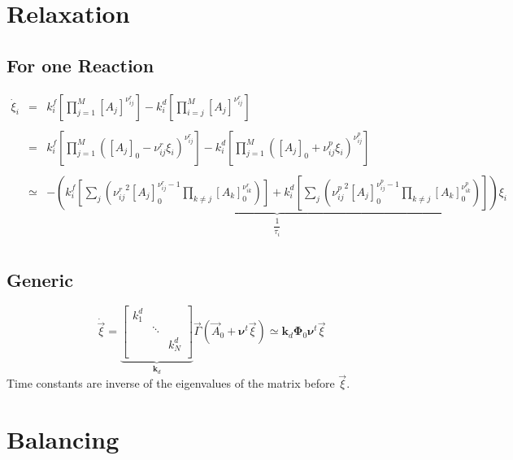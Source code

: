 \documentclass[aps,onecolumn,11pt]{revtex4}
\begin{document}
\section{Relaxation}

\subsection{For one Reaction}
\begin{equation}
\begin{array}{rcl}
\dot{\xi}_i & = &  \displaystyle k^f_i \left[ \prod_{j=1}^M [A_j]^{\nu^r_{ij}}  \right] - k^d_i \left[ \prod_{i=j}^M [A_j]^{\nu^r_{ij}} \right] \\
\\
 & = &  \displaystyle k^f_i \left[ \prod_{j=1}^M ([A_j]_0 - \nu^r_{ij} \xi_i )^{\nu^r_{ij}}  \right] 
 -   k^d_i \left[ \prod_{j=1}^M ([A_j]_0 + \nu^p_{ij} \xi_i )^{\nu^p_{ij}}  \right] \\
 \\
 & \simeq & \displaystyle
- \underbrace{\left(
  k^f_i \left[ \sum_j \left( {\nu^r_{ij}}^2 [A_j]_0^{\nu^r_{ij}-1} \prod_{k\not=j} [A_k]_0^{\nu^r_{ik}}\right) \right]
 +k^d_i \left[ \sum_j \left( {\nu^p_{ij}}^2 [A_j]_0^{\nu^p_{ij}-1} \prod_{k\not=j} [A_k]_0^{\nu^p_{ik}}\right) \right]
  \right)}_{\dfrac{1}{\tau_i}} \xi_i
 \\
\end{array}
\end{equation}

\subsection{Generic}

\begin{equation}
	\dot{\vec{\xi}} = 
	\underbrace{
	\begin{bmatrix}
	k^d_1 &  &\\
	      & \ddots & \\
	      & & k^d_N\\ 
	\end{bmatrix}
	}_{\bm{k}_d}
	\vec{\Gamma}(\vec{A}_0 + \bm{\nu}^t \vec{\xi})
	\simeq \bm{k}_d \bm{\Phi}_0 \bm{\nu}^t \vec{\xi}
\end{equation}
Time constants are inverse of the eigenvalues of the matrix before $\vec{\xi}$.

\section{Balancing}
\end{document}
